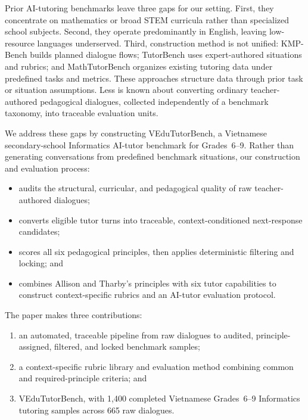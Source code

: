 \documentclass[conference]{IEEEtran}
\newcommand{\benchmarkname}{VEduTutorBench}
\begin{document}
Prior AI-tutoring benchmarks leave three gaps for our setting. First,
they concentrate on mathematics or broad STEM curricula rather than
specialized school subjects. Second, they operate predominantly in English, leaving low-resource languages underserved.
Third, construction method is not unified: KMP-Bench builds planned dialogue flows;
TutorBench uses expert-authored situations and rubrics; and MathTutorBench
organizes existing tutoring data under predefined tasks and metrics. These
approaches structure data through prior task or situation assumptions. Less is
known about converting ordinary teacher-authored pedagogical dialogues,
collected independently of a benchmark taxonomy, into traceable evaluation
units.

We address these gaps by constructing \benchmarkname, a Vietnamese
secondary-school Informatics AI-tutor benchmark for Grades~6--9. Rather than generating
conversations from predefined benchmark situations, our construction and
evaluation process:
\begin{itemize}
    \setlength{\itemsep}{0pt}\setlength{\topsep}{2pt}
    \item audits the structural, curricular, and pedagogical quality of raw
    teacher-authored dialogues;
    \item converts eligible tutor turns into traceable,
    context-conditioned next-response candidates;
    \item scores all six pedagogical principles, then applies deterministic
    filtering and locking; and
    \item combines Allison and Tharby's principles
    \cite{allison2015making} with six tutor capabilities to construct
    context-specific rubrics and an AI-tutor evaluation protocol.
\end{itemize}

The paper makes three contributions:
\begin{enumerate}
    \setlength{\itemsep}{0pt}\setlength{\topsep}{2pt}
    \item an automated, traceable pipeline from raw dialogues to audited,
    principle-assigned, filtered, and locked benchmark samples;
    \item a context-specific rubric library and evaluation method combining
    common and required-principle criteria; and
    \item \benchmarkname, with 1,400 completed Vietnamese Grades~6--9
    Informatics tutoring samples across 665 raw dialogues.
\end{enumerate}
\end{document}
